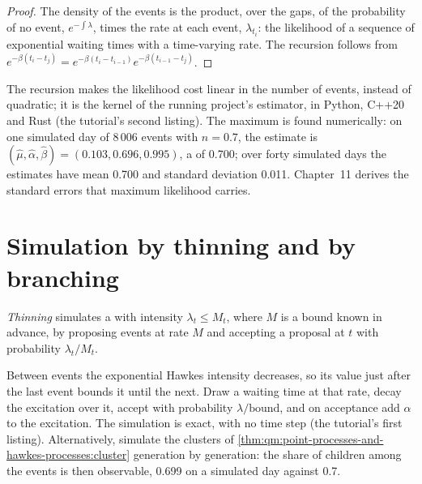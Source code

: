 \begin{proof}
The density of the events is the product, over the gaps, of the probability of no event, $e^{-\int\lambda}$,
times the rate at each event, $\lambda_{t_i}$: the likelihood of a sequence of exponential waiting times with a
time-varying rate. The recursion follows from $e^{-\beta(t_i - t_j)} = e^{-\beta(t_i - t_{i-1})}e^{-\beta(t_{i-1} - t_j)}$.
\end{proof}

The recursion makes the likelihood cost linear in the number of events, instead of quadratic; it is the
kernel of the running project's estimator, in Python, C++20 and Rust (the
tutorial's second listing). The maximum is found numerically: on one
simulated day of 8\,006 events with $n = 0.7$, the estimate is $(\hat\mu, \hat\alpha, \hat\beta) = (0.103, 0.696, 0.995)$,
a  of 0.700; over forty simulated days the estimates have mean 0.700 and standard deviation
0.011. Chapter~11 derives the standard errors that maximum likelihood carries.

\section{Simulation by thinning and by branching}

\begin{definition}[Thinning]\label{def:qm:point-processes-and-hawkes-processes:thinning}
\emph{Thinning} simulates a  with intensity $\lambda_t \le M_t$, where $M$ is a bound known
in advance, by proposing events at rate $M$ and accepting a proposal at $t$ with probability $\lambda_t/M_t$.
\end{definition}

\begin{method}\label{met:qm:point-processes-and-hawkes-processes:ogata}
Between events the exponential Hawkes intensity decreases, so its value just after the last event bounds it
until the next. Draw a waiting time at that rate, decay the excitation over it, accept with probability
$\lambda/\text{bound}$, and on acceptance add $\alpha$ to the excitation. The simulation is exact, with no time step (the
tutorial's first listing). Alternatively, simulate the clusters of
\cref{thm:qm:point-processes-and-hawkes-processes:cluster} generation by generation: the share of children
among the events is then observable, 0.699 on a simulated day against 0.7.
\end{method}

